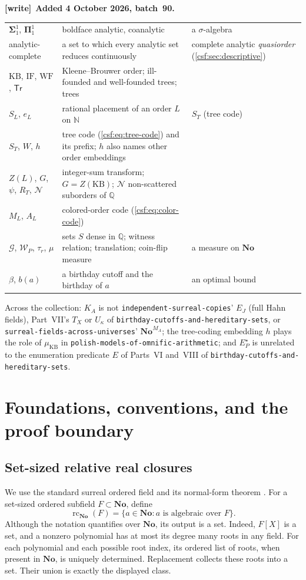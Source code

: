 \documentclass[11pt,a4paper]{article}
\numberwithin{equation}{section}
\theoremstyle{definition}
\theoremstyle{remark}
\newcommand{\N}{\mathbb N}
\newcommand{\Q}{\mathbb Q}
\newcommand{\No}{\mathbf{No}}
\newcommand{\rc}{\operatorname{rc}}
\newcommand{\Sig}{\boldsymbol\Sigma^1_1}
\newcommand{\PiC}{\boldsymbol\Pi^1_1}
\newcommand{\KB}{\mathrm{KB}}
\newcommand{\IF}{\mathrm{IF}}
\newcommand{\WF}{\mathrm{WF}}
\newcommand{\repo}[1]{\nolinkurl{#1}}
\newenvironment{writenote}[1][]{\par\smallskip\begingroup\small\raggedright
 \setlength{\parindent}{1.25em}\noindent\textbf{[write]}\if\relax\detokenize{#1}\relax\else~\textbf{#1.}\fi\ }%
 {\par\endgroup\smallskip}
\begin{document}
\begin{writenote}[Added 4 October 2026, batch~90]
{\begin{longtable}{P{0.2\textwidth}P{0.4\textwidth}P{0.3\textwidth}}
$\Sig$, $\PiC$ & boldface analytic, coanalytic & a $\sigma$-algebra\\
analytic-complete & a set to which every analytic set reduces continuously & complete analytic \emph{quasiorder} (\cref{csf:sec:descriptive})\\
$\KB$, $\IF$, $\WF$, $\mathsf{Tr}$ & Kleene--Brouwer order; ill-founded and well-founded trees; trees & \\
$S_L$, $e_L$ & rational placement of an order $L$ on $\N$ & $S_T$ (tree code)\\
$S_T$, $W$, $h$ & tree code (\cref{csf:eq:tree-code}) and its prefix; $h$ also names other order embeddings & \\
$Z(L)$, $G$, $\psi$, $R_T$, $\mathcal N$ & integer-sum transform; $G=Z(\KB)$; $\mathcal N$ non-scattered suborders of $\Q$ & \\
$M_L$, $A_L$ & colored-order code (\cref{csf:eq:color-code}) & \\
$\mathcal G$, $\mathcal W_P$, $\tau_r$, $\mu$ & sets $S$ dense in $\Q$; witness relation; translation; coin-flip measure & a measure on $\No$\\
$\beta$, $b(a)$ & a birthday cutoff and the birthday of $a$ & an optimal bound\\
\bottomrule
\end{longtable}
\par}
Across the collection: $K_A$ is not \repo{independent-surreal-copies}' $E_J$ (full Hahn fields), Part~VII's $T_X$ or $U_\kappa$ of \repo{birthday-cutoffs-and-hereditary-sets}, or \repo{surreal-fields-across-universes}' $\No^{M_A}$; the tree-coding embedding $h$ plays the role of $\mu_{\KB}$ in \repo{polish-models-of-omnific-arithmetic}; and $E^\star_P$ is unrelated to the enumeration predicate $E$ of Parts~VI and~VIII of \repo{birthday-cutoffs-and-hereditary-sets}.
\end{writenote}

\section{Foundations, conventions, and the proof boundary}
\label{csf:sec:foundations}

\subsection{Set-sized relative real closures}

We use the standard surreal ordered field and its normal-form theorem
\cite{gonshor,vde}. For a set-sized ordered subfield $F\subset\No$, define
\[
 \rc_{\No}(F)=\{a\in\No:a\text{ is algebraic over }F\}.
\]
Although the notation quantifies over $\No$, its output is a set. Indeed,
$F[X]$ is a set, and a nonzero polynomial has at most its degree many roots
in any field. For each polynomial and each possible root index, its ordered
list of roots, when present in $\No$, is uniquely determined. Replacement
collects these roots into a set. Their union is exactly the displayed class.
\end{document}

